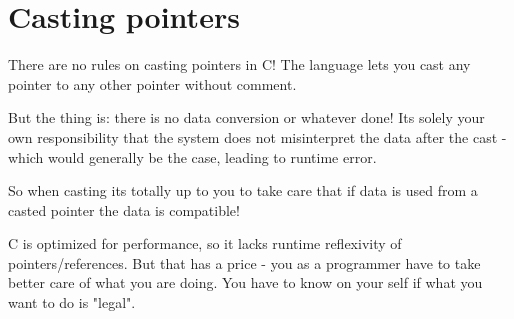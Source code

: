 
\chapter{Casting pointers}
There are no rules on casting pointers in C! The language lets you cast any pointer to any other pointer without comment.

But the thing is: there is no data conversion or whatever done! Its solely your own responsibility that the system does not misinterpret the data after the cast - which would generally be the case, leading to runtime error.

So when casting its totally up to you to take care that if data is used from a casted pointer the data is compatible!

C is optimized for performance, so it lacks runtime reflexivity of pointers/references. But that has a price - you as a programmer have to take better care of what you are doing. You have to know on your self if what you want to do is "legal".

